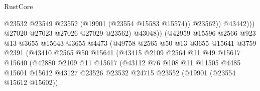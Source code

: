 \begin{lexlean}{RustCore}
\begin{coremodule}
                                              @23532
                                              @23549
                                              @23552
                                              (@19901 (@23554 @15583 @15574))
                                              @23562))
                                          @43442)))
                                    @27020
                                    @27023
                                    @27026
                                    @27029
                                    @23562)
                                  @43048))
                              (@42959
                                @15596
                                @2566
                                @923
                                @13
                                @3655
                                @15643
                                @3655
                                @4473
                                (@49758
                                  @2565
                                  @50
                                  @13
                                  @3655
                                  @15641
                                  @3759
                                  @2391
                                  (@43410
                                    @2565
                                    @50
                                    @15641
                                    (@43415
                                      @2109
                                      @2564
                                      @11
                                      @49
                                      @15617
                                      @15640
                                      (@42880
                                        @2109
                                        @11
                                        @15617
                                        (@43112
                                          @76
                                          @108
                                          @11
                                          @11505
                                          @4485
                                          @15601
                                          @15612
                                          @43127
                                          @23526
                                          @23532
                                          @24715
                                          @23552
                                          (@19901 (@23554 @15612 @15602))

\end{coremodule}
\end{lexlean}
